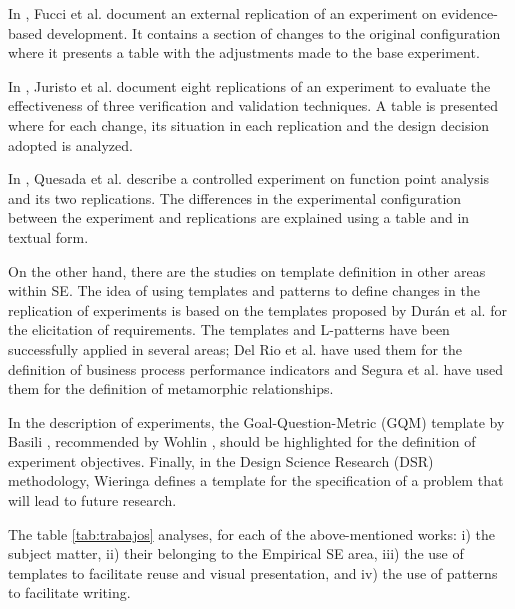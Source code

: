 In \cite{fucci2016external}, Fucci et al. document an external replication of an experiment on evidence-based development. It contains a section of changes to the original configuration where it presents a table with the adjustments made to the base experiment.

In \cite{juristo2012comparing}, Juristo et al. document eight replications of an experiment to evaluate the effectiveness of three verification and validation techniques. A table is presented where for each change, its situation in each replication and the design decision adopted is analyzed.

In \cite{quesada2016empirical}, Quesada et al. describe a controlled experiment on function point analysis and its two replications. The differences in the experimental configuration between the experiment and replications are explained using a table and in textual form.

On the other hand, there are the studies on template definition in other areas within SE. The idea of using templates and patterns to define changes in the replication of experiments is based on the templates proposed by Durán et al. \cite{duran1999requirements} for the elicitation of requirements.  The templates and L-patterns have been successfully applied in several areas; Del Rio et al. \cite{del2012defining} have used them for the definition of business process performance indicators and Segura et al.  \cite{segura2017template} have used them for the definition of metamorphic relationships.

In the description of experiments, the Goal-Question-Metric (GQM) template by Basili \cite{Basili1994}, recommended by Wohlin \cite{wohlin:experimentation}, should be highlighted for the definition of experiment objectives. Finally, in the Design Science Research (DSR) methodology, Wieringa \cite{38631e0608b54d4299d5707f3a78debf} defines a template for the specification of a problem that will lead to future research.


The table \ref{tab:trabajos} analyses, for each of the above-mentioned works: i) the subject matter, ii) their belonging to the Empirical SE area, iii) the use of templates to facilitate reuse and visual presentation, and iv) the use of patterns to facilitate writing.




